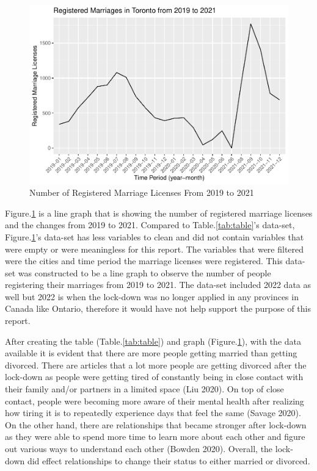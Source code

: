 \documentclass[
]{article}
\begin{document}
\begin{figure}
\centering
\includegraphics{Divorces-During-COVID-19_files/figure-latex/line-1.pdf}
\caption{\label{fig:line}Number of Registered Marriage Licenses From 2019 to 2021}
\end{figure}

Figure.\ref{fig:line} is a line graph that is showing the number of registered marriage licenses and the changes from 2019 to 2021. Compared to Table.\ref{tab:table}'s data-set, Figure.\ref{fig:line}'s data-set has less variables to clean and did not contain variables that were empty or were meaningless for this report. The variables that were filtered were the cities and time period the marriage licenses were registered. This data-set was constructed to be a line graph to observe the number of people registering their marriages from 2019 to 2021. The data-set included 2022 data as well but 2022 is when the lock-down was no longer applied in any provinces in Canada like Ontario, therefore it would have not help support the purpose of this report.

After creating the table (Table.\ref{tab:table}) and graph (Figure.\ref{fig:line}), with the data available it is evident that there are more people getting married than getting divorced. There are articles that a lot more people are getting divorced after the lock-down as people were getting tired of constantly being in close contact with their family and/or partners in a limited space (Liu 2020). On top of close contact, people were becoming more aware of their mental health after realizing how tiring it is to repeatedly experience days that feel the same (Savage 2020). On the other hand, there are relationships that became stronger after lock-down as they were able to spend more time to learn more about each other and figure out various ways to understand each other (Bowden 2020). Overall, the lock-down did effect relationships to change their status to either married or divorced.
\end{document}
